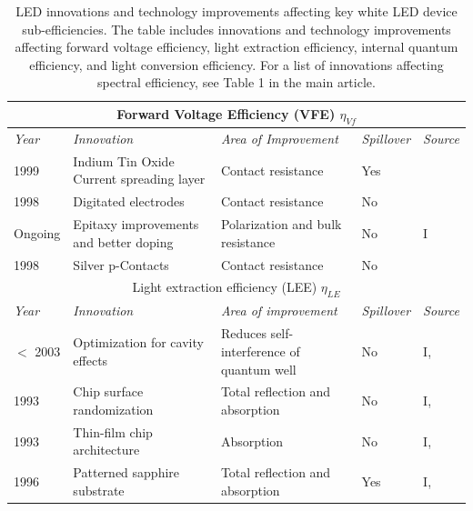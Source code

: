 \documentclass[10pt]{article}
\begin{document}
\begin{table}[H]
    \caption{LED innovations and technology improvements affecting key white LED device sub-efficiencies. The table includes innovations and technology improvements affecting forward voltage efficiency, light extraction efficiency, internal quantum efficiency, and light conversion efficiency. For a list of innovations affecting spectral efficiency, see Table 1 in the main article.}
    \vspace{5mm}
    \begin{tabularx}{\textwidth}{ |l|X|X|l|l| }
        \multicolumn{5}{c}{Forward Voltage Efficiency (VFE) $\eta_{Vf}$} \\
        \hline
            \textit{Year} & \textit{Innovation} & \textit{Area of Improvement} & \textit{Spillover} & \textit{Source} \\
        \hline
            1999 & Indium Tin Oxide \newline Current spreading layer & Contact resistance & Yes & \cite{margalith1999indium}\\
        \hline
            1998 & Digitated electrodes & Contact resistance & No & \cite{steigerwald2001electrode} \\
        \hline
            Ongoing & Epitaxy improvements \newline and better doping & Polarization and \newline bulk resistance & No & I \\
        \hline
            1998 & Silver p-Contacts & Contact resistance & No & \cite{kondoh2001nitride} \\
        \hline
        \multicolumn{5}{c}{Light extraction efficiency (LEE) $\eta_{LE}$} \\
        \hline
            \textit{Year} & \textit{Innovation} & \textit{Area of improvement} & \textit{Spillover} & \textit{Source} \\
        \hline
            $<$ 2003 & Optimization for \newline cavity effects & Reduces self-interference of quantum well & No & I, \cite{Shen2003} \\
        \hline
            1993 & Chip surface randomization & Total reflection and absorption & No & I, \cite{bergh1973surface}\cite{Schnitzer1993} \\
        \hline
            1993 & Thin-film chip architecture & Absorption & No & I, \cite{Schnitzer1993} \\
        \hline
            1996 & Patterned sapphire substrate  & Total reflection and absorption & Yes & I, \cite{Tadatomo2001} \\

\end{tabularx}
\end{table}
\end{document}
